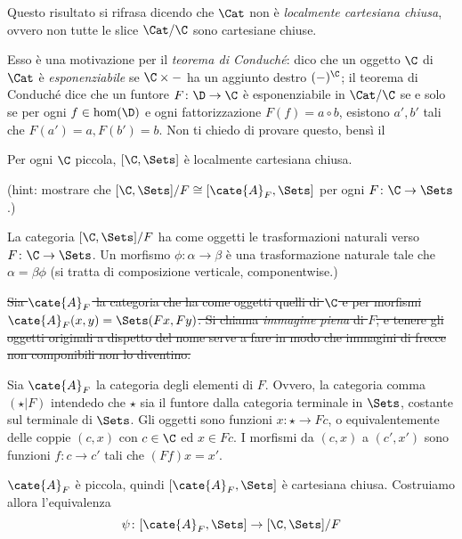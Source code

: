 \begin{oss}
Questo risultato si rifrasa dicendo che $\Cat$ non \`e \emph{localmente cartesiana chiusa}, ovvero non tutte le slice $\Cat/\C$ sono cartesiane chiuse. 

Esso \`e una motivazione per il \emph{teorema di Conduch\'e}: dico che un oggetto $\C$ di $\Cat$ \`e \emph{esponenziabile} se $\C\times -$ ha un aggiunto destro $(-)^\C$; il teorema di Conduch\'e dice che un funtore $F\colon \D\to\C$ \`e esponenziabile in $\Cat/\C$ se e solo se per ogni $f\in\hom(\D)$ e ogni fattorizzazione $F(f)=a\circ b$, esistono $a',b'$ tali che $F(a')=a, F(b')=b$. Non ti chiedo di provare questo, bens\`i il
\begin{thm}[Bonus]
Per ogni $\C$ piccola, $[\C,\Sets]$ \`e localmente cartesiana chiusa.
\end{thm}
(hint: mostrare che $[\C,\Sets]/F\cong [\cate{A}_F, \Sets]$ per ogni $F\colon \C\to \Sets$.)
{\proof
La categoria $[\C,\Sets]/F$ ha come oggetti le trasformazioni naturali verso $F\colon\C\to\Sets$.
Un morfismo $\phi\colon\alpha\to\beta$ è una trasformazione naturale tale che $\alpha=\beta\phi$ (si tratta di composizione verticale, componentwise.)

\sout{Sia $\cate{A}_F$ la categoria che ha come oggetti quelli di $\C$ e per morfismi $\cate{A}_F(x,y)=\Sets(Fx,Fy)$.
Si chiama {\it immagine piena} di $F$, e tenere gli oggetti originali a dispetto del nome serve a fare in modo che immagini di frecce non componibili non lo diventino.}

Sia $\cate{A}_F$ la categoria degli elementi di $F$. Ovvero, la categoria comma $(\star\vert F)$ intendedo che $\star$ sia il funtore dalla categoria terminale in $\Sets$, costante sul terminale di $\Sets$. Gli oggetti sono funzioni $x\colon\star\to Fc$, o equivalentemente delle coppie $(c,x)$ con $c\in\C$ ed $x\in Fc$. I morfismi da $(c,x)$ a $(c',x')$ sono funzioni $f\colon c\to c'$ tali che $(Ff)x=x'$.

$\cate{A}_F$ è piccola, quindi $[\cate{A}_F, \Sets]$ è cartesiana chiusa. Costruiamo allora l'equivalenza
\[ \psi\colon [\cate{A}_F, \Sets] \to [\C,\Sets]/F \]

}
\end{oss}
